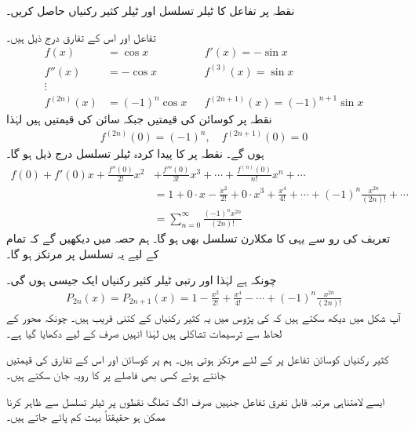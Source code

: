 

نقطہ  پر تفاعل  کا ٹیلر تسلسل اور ٹیلر کثیر رکنیاں حاصل کریں۔

تفاعل اور اس کے تفارق درج ذیل ہیں۔
\begin{align*}
f(x)&=\cos x&& f'(x)=-\sin x\\
f''(x)&=-\cos x&&f^{(3)}(x)=\sin x\\
\vdots&\\
f^{(2n)}(x)&=(-1)^n \cos x&&f^{(2n+1)}(x)=(-1)^{n+1}\sin x
\end{align*}
نقطہ  پر کوسائن کی قیمتیں  جبکہ سائن کی قیمتیں  ہیں لہٰذا
\begin{align*}
f^{(2n)}(0)=(-1)^n,\quad f^{(2n+1)}(0)=0
\end{align*}
ہوں گے۔ نقطہ  پر  کا پیدا کردہ ٹیلر تسلسل درج ذیل ہو گا۔
\begin{align*}
f(0)+f'(0)x+\frac{f''(0)}{2!}x^2&+\frac{f'''(0)}{3!}x^3+\cdots+\frac{f^{(n)}(0)}{n!}x^n+\cdots\\
&=1+0\cdot x-\frac{x^2}{2!}+0\cdot x^3+\frac{x^4}{4!}+\cdots+(-1)^n\frac{x^{2n}}{(2n)!}+\cdots\\
&=\sum_{n=0}^{\infty}\frac{(-1)^n x^{2n}}{(2n)!}
\end{align*}
تعریف کی رو سے یہی  کا مکلارن تسلسل بھی ہو گا۔ ہم حصہ  میں دیکھیں گے کہ تمام  کے لیے یہ تسلسل  پر مرتکز ہو گا۔

چونکہ  ہے لہٰذا  اور  رتبی ٹیلر کثیر رکنیاں ایک  جیسی ہوں گی۔
\begin{align*}
P_{2n}(x)=P_{2n+1}(x)=1-\frac{x^2}{2!}+\frac{x^4}{4!}-\cdots+(-1)^n\frac{x^{2n}}{(2n)!}
\end{align*}
آپ شکل  میں دیکھ سکتے ہیں کہ  کی پڑوس میں یہ کثیر رکنیاں  کے  کتنی قریب ہیں۔ چونکہ محور  کے لحاظ سے ترسیمات تشاکلی ہیں لہٰذا انہیں صرف  کے لیے دکھایا گیا ہے۔ 

کثیر رکنیاں  کوسائن تفاعل پر  کے لئے  مرتکز ہوتی ہیں۔ ہم  پر کوسائن اور اس کے تفارق کی قیمتیں جانتے ہوئے کسی بھی فاصلے پر  کا رویہ جان سکتے ہیں۔

ایسے لامتناہی مرتبہ قابل تفرق تفاعل جنہیں صرف الگ تھلگ نقطوں پر ٹیلر تسلسل سے ظاہر کرنا ممکن ہو حقیقتاً بہت کم پائے جاتے ہیں۔



